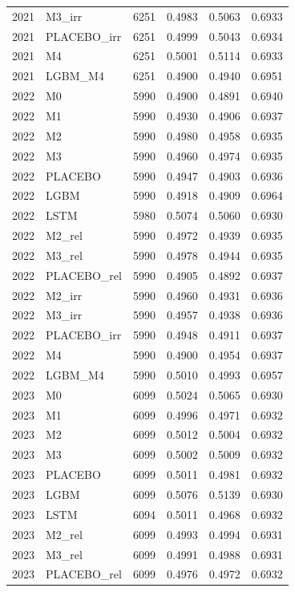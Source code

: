 \begin{tabular}{llrrrr}
2021 & M3\_irr & 6251 & 0.4983 & 0.5063 & 0.6933 \\
2021 & PLACEBO\_irr & 6251 & 0.4999 & 0.5043 & 0.6934 \\
2021 & M4 & 6251 & 0.5001 & 0.5114 & 0.6933 \\
2021 & LGBM\_M4 & 6251 & 0.4900 & 0.4940 & 0.6951 \\
2022 & M0 & 5990 & 0.4900 & 0.4891 & 0.6940 \\
2022 & M1 & 5990 & 0.4930 & 0.4906 & 0.6937 \\
2022 & M2 & 5990 & 0.4980 & 0.4958 & 0.6935 \\
2022 & M3 & 5990 & 0.4960 & 0.4974 & 0.6935 \\
2022 & PLACEBO & 5990 & 0.4947 & 0.4903 & 0.6936 \\
2022 & LGBM & 5990 & 0.4918 & 0.4909 & 0.6964 \\
2022 & LSTM & 5980 & 0.5074 & 0.5060 & 0.6930 \\
2022 & M2\_rel & 5990 & 0.4972 & 0.4939 & 0.6935 \\
2022 & M3\_rel & 5990 & 0.4978 & 0.4944 & 0.6935 \\
2022 & PLACEBO\_rel & 5990 & 0.4905 & 0.4892 & 0.6937 \\
2022 & M2\_irr & 5990 & 0.4960 & 0.4931 & 0.6936 \\
2022 & M3\_irr & 5990 & 0.4957 & 0.4938 & 0.6936 \\
2022 & PLACEBO\_irr & 5990 & 0.4948 & 0.4911 & 0.6937 \\
2022 & M4 & 5990 & 0.4900 & 0.4954 & 0.6937 \\
2022 & LGBM\_M4 & 5990 & 0.5010 & 0.4993 & 0.6957 \\
2023 & M0 & 6099 & 0.5024 & 0.5065 & 0.6930 \\
2023 & M1 & 6099 & 0.4996 & 0.4971 & 0.6932 \\
2023 & M2 & 6099 & 0.5012 & 0.5004 & 0.6932 \\
2023 & M3 & 6099 & 0.5002 & 0.5009 & 0.6932 \\
2023 & PLACEBO & 6099 & 0.5011 & 0.4981 & 0.6932 \\
2023 & LGBM & 6099 & 0.5076 & 0.5139 & 0.6930 \\
2023 & LSTM & 6094 & 0.5011 & 0.4968 & 0.6932 \\
2023 & M2\_rel & 6099 & 0.4993 & 0.4994 & 0.6931 \\
2023 & M3\_rel & 6099 & 0.4991 & 0.4988 & 0.6931 \\
2023 & PLACEBO\_rel & 6099 & 0.4976 & 0.4972 & 0.6932 \\

\end{tabular}
